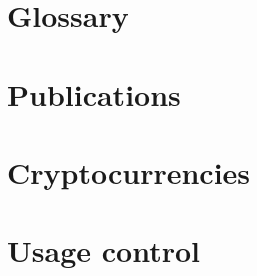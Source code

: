 \documentclass[a4paper,11pt,pagebackref=true]{report}
\begin{document}

\appendix

\chapter{Glossary}
\label{A_glossary}


\chapter{Publications}
\label{A_Publications}
 

\chapter{Cryptocurrencies}
\label{A_cryptocurrencies}


\chapter{Usage control}
\label{A_usage_control} 


\end{document}
